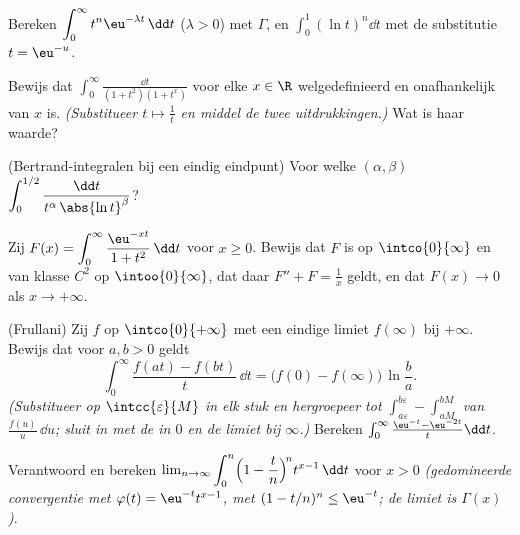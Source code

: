 \begin{exercise}[$\star$]\label{exo:b2:integration:2}
Bereken $\displaystyle\int_0^\infty t^n \eu^{-\lambda t}\,\dd t$
($\lambda > 0$) met $\Gamma$, en $\displaystyle\int_0^1 (\ln t)^n
\dd t$ met de substitutie $t = \eu^{-u}$.
\end{exercise}

\begin{exercise}[$\star$]\label{exo:b2:integration:3}
Bewijs dat $\displaystyle\int_0^{\infty} \frac{\dd t}{(1 + t^2)(1 +
t^x)}$ voor elke $x \in \R$ welgedefinieerd en onafhankelijk van
$x$ is. \emph{(Substitueer $t \mapsto \frac1t$ en middel de twee
uitdrukkingen.)} Wat is haar waarde?
\end{exercise}

\begin{exercise}[$\star\star$]\label{exo:b2:integration:4}
(Bertrand-integralen bij een eindig eindpunt) Voor welke $(\alpha,
\beta)$  $\displaystyle\int_0^{1/2} \frac{\dd
t}{t^\alpha\,\abs{\ln t}^\beta}$?
\end{exercise}

\begin{exercise}[$\star\star$]\label{exo:b2:integration:5}
Zij $F(x) = \displaystyle\int_0^{\infty} \frac{\eu^{-xt}}{1 +
t^2}\,\dd t$ voor $x \geq 0$. Bewijs dat $F$  is op
$\intco{0}{\infty}$ en van klasse $C^2$ op $\intoo{0}{\infty}$,
dat daar $F'' + F = \frac1x$ geldt, en dat $F(x) \to 0$ als $x \to
+\infty$.
\end{exercise}

\begin{exercise}[$\star\star$]\label{exo:b2:integration:6}
(Frullani) Zij $f$  op $\intco{0}{+\infty}$ met een eindige
limiet $f(\infty)$ bij $+\infty$. Bewijs dat voor $a, b > 0$ geldt
\[
\int_0^{\infty} \frac{f(at) - f(bt)}{t}\,\dd t
= \bigl(f(0) - f(\infty)\bigr)\,\ln\frac ba .
\]
\emph{(Substitueer op $\intcc{\varepsilon}{M}$ in elk stuk en
hergroepeer tot $\int_{a\varepsilon}^{b\varepsilon} -
\int_{aM}^{bM}$ van $\frac{f(u)}u\,\dd u$; sluit in met de
 in $0$ en de limiet bij $\infty$.)} Bereken
$\int_0^\infty \frac{\eu^{-t} - \eu^{-2t}}{t}\dd t$.
\end{exercise}

\begin{exercise}[$\star\star$]\label{exo:b2:integration:7}
Verantwoord en bereken $\lim_{n\to\infty} \displaystyle\int_0^n
\Bigl(1 - \frac tn\Bigr)^{\!n} t^{x-1}\,\dd t$ voor $x > 0$
\emph{(gedomineerde convergentie met $\varphi(t) =
\eu^{-t}t^{x-1}$, met $(1 - t/n)^n \leq \eu^{-t}$; de limiet is
$\Gamma(x)$)}.
\end{exercise}

